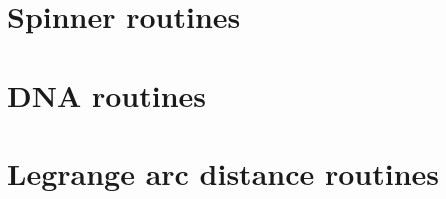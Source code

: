 \section{Spinner routines}
  \label{sec:src_spinner}
  
  
\section{DNA routines}
  \label{sec:src_dna}
  
  
\section{Legrange arc distance routines}
  \label{sec:src_larc}
  
  
